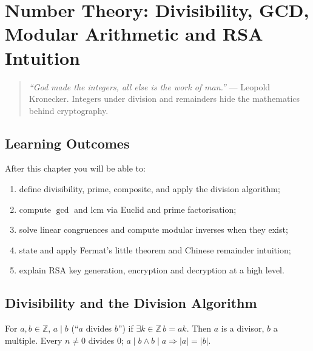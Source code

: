 \chapter[Number Theory]{Number Theory: Divisibility, GCD, Modular Arithmetic and RSA Intuition}
\label{ch:numbertheory}

\begin{quote}
\emph{``God made the integers, all else is the work of man.''} --- Leopold Kronecker. Integers under division and remainders hide the mathematics behind cryptography.
\end{quote}

\noindent{}
\vspace{0.4em}

\section*{Learning Outcomes}
After this chapter you will be able to:
\begin{enumerate}[label=(L\arabic*)]
    \item define divisibility, prime, composite, and apply the division algorithm;
    \item compute $\gcd$ and $\mathrm{lcm}$ via Euclid and prime factorisation;
    \item solve linear congruences and compute modular inverses when they exist;
    \item state and apply Fermat's little theorem and Chinese remainder intuition;
    \item explain RSA key generation, encryption and decryption at a high level.
\end{enumerate}

\section{Divisibility and the Division Algorithm}
\label{sec:divisibility}
For $a,b\in\mathbb{Z}$, $a\mid b$ (``$a$ divides $b$'') if $\exists k\in\mathbb{Z}\,b=ak$. Then $a$ is a divisor, $b$ a multiple. Every $n\neq0$ divides $0$; $a\mid b\land b\mid a\Rightarrow |a|=|b|$.

